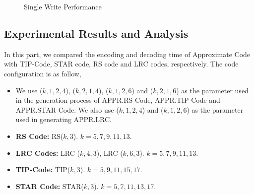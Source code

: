 \documentclass[sigconf]{acmart}
\begin{document}
\begin{figure}[ht]
\caption{Single Write Performance}\label{fig-Sig-Write}
\end{figure}

\subsection{Experimental Results and Analysis}
In this part, we compared the encoding and decoding time of Approximate Code with TIP-Code, STAR code, RS code and LRC codes, respectively. The code configuration is as follow,
\begin{itemize}
    \item We use ($k,1,2,4$), ($k,2,1,4$), ($k,1,2,6$) and ($k,2,1,6$) as the parameter used in the generation process of APPR.RS Code, APPR.TIP-Code and APPR.STAR Code. We also use ($k,1,2,4$) and ($k,1,2,6$) as the parameter used in generating APPR.LRC.
    \item \textbf{RS Code:} RS($k,3$). $k = 5,7,9,11,13$.
    \item \textbf{LRC Codes:} LRC ($k,4,3$), LRC ($k,6,3$). $k = 5,7,9,11,13$.
    \item \textbf{TIP-Code:} TIP($k,3$). $k = 5,9,11,15,17$.
    \item \textbf{STAR Code:} STAR($k,3$). $k = 5,7,11,13,17$.
\end{itemize}
\end{document}
